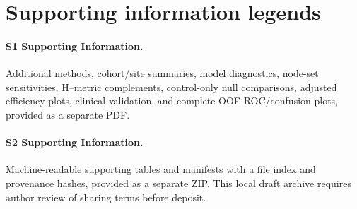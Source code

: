 \documentclass[10pt,letterpaper]{article}
\begin{document}
\section*{Supporting information legends}
\paragraph{S1 Supporting Information.} Additional methods, cohort/site summaries,
model diagnostics, node-set sensitivities, H--metric complements, control-only null
comparisons, adjusted efficiency plots, clinical validation, and complete OOF
ROC/confusion plots, provided as a separate PDF.
\paragraph{S2 Supporting Information.} Machine-readable supporting tables and
manifests with a file index and provenance hashes, provided as a separate ZIP.
This local draft archive requires author review of sharing terms before deposit.
\end{document}
